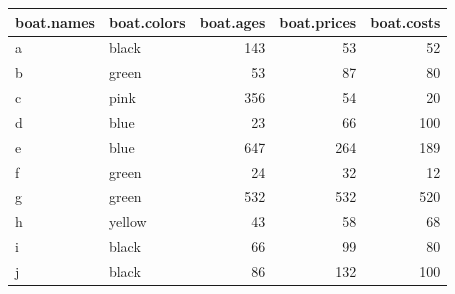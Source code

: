 \documentclass[]{book}
\theoremstyle{definition}
\theoremstyle{definition}
\theoremstyle{remark}
\begin{document}
\begin{tabular}{l|l|r|r|r}
\hline
boat.names & boat.colors & boat.ages & boat.prices & boat.costs\\
\hline
a & black & 143 & 53 & 52\\
\hline
b & green & 53 & 87 & 80\\
\hline
c & pink & 356 & 54 & 20\\
\hline
d & blue & 23 & 66 & 100\\
\hline
e & blue & 647 & 264 & 189\\
\hline
f & green & 24 & 32 & 12\\
\hline
g & green & 532 & 532 & 520\\
\hline
h & yellow & 43 & 58 & 68\\
\hline
i & black & 66 & 99 & 80\\
\hline
j & black & 86 & 132 & 100\\
\hline
\end{tabular}
\end{document}

